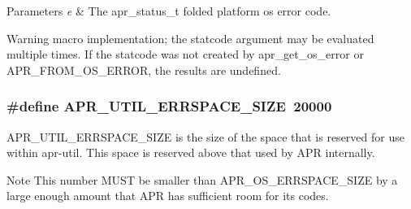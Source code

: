 \begin{DoxyParams}{Parameters}
{\em e} & The apr\+\_\+status\+\_\+t folded platform os error code. \\
\hline
\end{DoxyParams}
\begin{DoxyWarning}{Warning}
macro implementation; the statcode argument may be evaluated multiple times. If the statcode was not created by apr\+\_\+get\+\_\+os\+\_\+error or A\+P\+R\+\_\+\+F\+R\+O\+M\+\_\+\+O\+S\+\_\+\+E\+R\+R\+OR, the results are undefined. 
\end{DoxyWarning}
\subsubsection[{\texorpdfstring{A\+P\+R\+\_\+\+U\+T\+I\+L\+\_\+\+E\+R\+R\+S\+P\+A\+C\+E\+\_\+\+S\+I\+ZE}{APR_UTIL_ERRSPACE_SIZE}}]{\setlength{\rightskip}{0pt plus 5cm}\#define A\+P\+R\+\_\+\+U\+T\+I\+L\+\_\+\+E\+R\+R\+S\+P\+A\+C\+E\+\_\+\+S\+I\+ZE~20000}\hypertarget{group__apr__errno_gaef5e79630739f24d1512d0d044c2bae7}{}\label{group__apr__errno_gaef5e79630739f24d1512d0d044c2bae7}
A\+P\+R\+\_\+\+U\+T\+I\+L\+\_\+\+E\+R\+R\+S\+P\+A\+C\+E\+\_\+\+S\+I\+ZE is the size of the space that is reserved for use within apr-\/util. This space is reserved above that used by A\+PR internally. \begin{DoxyNote}{Note}
This number M\+U\+ST be smaller than A\+P\+R\+\_\+\+O\+S\+\_\+\+E\+R\+R\+S\+P\+A\+C\+E\+\_\+\+S\+I\+ZE by a large enough amount that A\+PR has sufficient room for its codes. 
\end{DoxyNote}
